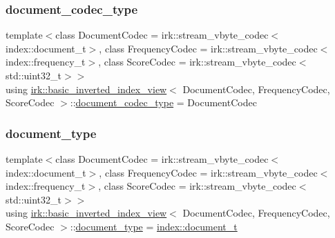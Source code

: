 \mbox{\label{classirk_1_1basic__inverted__index__view_a90415f73bd983f8a661d5502134d334f}} 
\subsubsection{\texorpdfstring{document\+\_\+codec\+\_\+type}{document\_codec\_type}}
{\footnotesize\ttfamily template$<$class Document\+Codec  = irk\+::stream\+\_\+vbyte\+\_\+codec$<$index\+::document\+\_\+t$>$, class Frequency\+Codec  = irk\+::stream\+\_\+vbyte\+\_\+codec$<$index\+::frequency\+\_\+t$>$, class Score\+Codec  = irk\+::stream\+\_\+vbyte\+\_\+codec$<$std\+::uint32\+\_\+t$>$$>$ \\
using \mbox{\hyperlink{classirk_1_1basic__inverted__index__view}{irk\+::basic\+\_\+inverted\+\_\+index\+\_\+view}}$<$ Document\+Codec, Frequency\+Codec, Score\+Codec $>$\+::\mbox{\hyperlink{classirk_1_1basic__inverted__index__view_a90415f73bd983f8a661d5502134d334f}{document\+\_\+codec\+\_\+type}} =  Document\+Codec}

\mbox{\label{classirk_1_1basic__inverted__index__view_aa687d7f6babce15088ca5792a6fbb9b3}} 
\subsubsection{\texorpdfstring{document\+\_\+type}{document\_type}}
{\footnotesize\ttfamily template$<$class Document\+Codec  = irk\+::stream\+\_\+vbyte\+\_\+codec$<$index\+::document\+\_\+t$>$, class Frequency\+Codec  = irk\+::stream\+\_\+vbyte\+\_\+codec$<$index\+::frequency\+\_\+t$>$, class Score\+Codec  = irk\+::stream\+\_\+vbyte\+\_\+codec$<$std\+::uint32\+\_\+t$>$$>$ \\
using \mbox{\hyperlink{classirk_1_1basic__inverted__index__view}{irk\+::basic\+\_\+inverted\+\_\+index\+\_\+view}}$<$ Document\+Codec, Frequency\+Codec, Score\+Codec $>$\+::\mbox{\hyperlink{classirk_1_1basic__inverted__index__view_aa687d7f6babce15088ca5792a6fbb9b3}{document\+\_\+type}} =  \mbox{\hyperlink{namespaceirk_1_1index_af829dedea20da89f9b51b49d78f57006}{index\+::document\+\_\+t}}}

